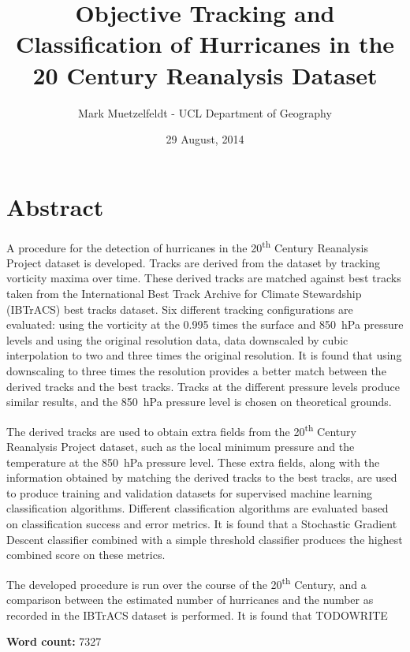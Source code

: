 \documentclass[pdftex,12pt,a4paper]{report}
\title{Objective Tracking and Classification of Hurricanes in the 20\ts{th} Century Reanalysis Dataset}
\author{Mark Muetzelfeldt - UCL Department of Geography}
\date{29 August, 2014}
\newcommand{\ts}{\textsuperscript}
\begin{document}


\clearpage
\thispagestyle{empty}
\null
\addtocounter{page}{-1}%
\newpage

\onehalfspacing
\section*{Abstract}

A procedure for the detection of hurricanes in the 20\ts{th} Century Reanalysis Project dataset is
developed. Tracks are derived from the dataset by tracking vorticity maxima over time. These derived
tracks are matched against best tracks taken from the International Best Track Archive for Climate
Stewardship (IBTrACS) best tracks dataset. Six different tracking configurations are evaluated:
using the vorticity at the 0.995 times the surface and \SI{850}{hPa} pressure levels and using the
original resolution data, data downscaled by cubic interpolation to two and three times the original
resolution. It is found that using downscaling to three times the resolution provides a better match
between the derived tracks and the best tracks. Tracks at the different pressure levels produce
similar results, and the \SI{850}{hPa} pressure level is chosen on theoretical grounds.

The derived tracks are used to obtain extra fields from the 20\ts{th} Century Reanalysis
Project dataset, such as the local minimum pressure and the temperature at the \SI{850}{hPa}
pressure level. These extra fields, along with the information obtained by matching the derived
tracks to the best tracks, are used to produce training and validation datasets for supervised
machine learning classification algorithms. Different classification algorithms are evaluated based
on classification success and error metrics. It is found that a Stochastic Gradient Descent
classifier combined with a simple threshold classifier produces the highest combined score on these
metrics.

The developed procedure is run over the course of the 20\ts{th} Century, and a comparison between
the estimated number of hurricanes and the number as recorded in the IBTrACS dataset is performed.
It is found that TODOWRITE

\begin{center}
\textbf{Word count:} 7327 %
\end{center}
\end{document}
